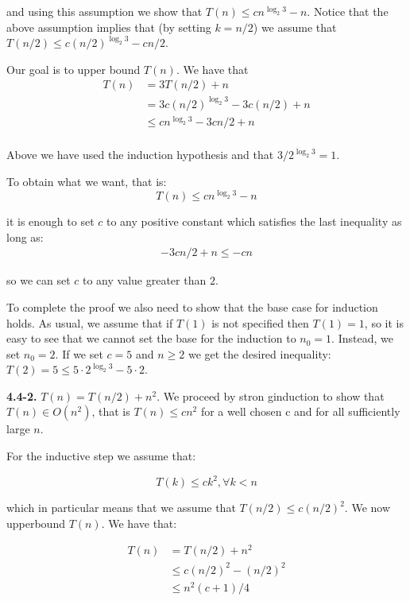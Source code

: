 \documentclass{article}
\newcommand{\Oh}{O}
\renewcommand{\leq}{\leqslant}
\renewcommand{\geq}{\geqslant}
\begin{document}
and using this assumption we show that $T(n) \leq cn^{\log_2 3} - n$. Notice that the above assumption implies that (by setting $k = n/2$) we assume that $T(n/2) \leq c(n/2)^{\log_2{3}} - cn/2$.

Our goal is to upper bound $T(n)$. We have that
\begin{equation*}
\begin{split}
T(n) &= 3T(n/2)+n \\
	 &= 3c(n/2)^{\log_2 3} - 3c(n/2) + n \\
	 & \leq cn^{\log_2 3} - 3cn / 2 + n \\
\end{split}
\end{equation*}

Above we have used the induction hypothesis and that  $3/2^{\log_2 3} = 1$.

To obtain what we want, that is:
\begin{equation*}
	T(n) \leq cn^{\log_2 3} - n
\end{equation*}

it is enough to set $c$ to any positive constant which satisfies the last inequality as long as:
\begin{align*}
	- 3cn / 2 + n \leq -cn
\end{align*}

so we can set $c$ to any value greater than $2$.

To complete the proof we also need to show that the base case for induction holds. As usual, we assume that if $T(1)$ is not specified then $T(1) = 1$, so it is easy to see that we cannot set the base for the induction to $n_0 = 1$. Instead, we set $n_0 = 2$. If we set $c = 5$ and $n \geq 2$ we get the desired inequality: $T(2) = 5 \leq 5 \cdot 2^{\log_2 3} - 5\cdot2$.


\noindent\textbf{4.4-2.} $T(n) = T(n / 2) + n^2$. We proceed by stron ginduction to show that $T(n) \in \Oh(n^2)$, that is $T(n) \leq cn^2$ for a well chosen c and for all sufficiently large $n$.

For the inductive step we assume that:

\begin{equation*}
\label{eq-second}
T(k) \leq ck^2, \forall k < n
\end{equation*}

which in particular means that we assume that $T(n/2) \leq c(n/2)^2$. We now upperbound $T(n)$. We have that:

\begin{equation*}
\label{eq-v1}
\begin{split}
T(n) &= T(n/2) + n^2 \\
	 & \leq c(n/2)^{2} - (n/2)^2 \\
	 & \leq n^2(c+1)/4 \\
\end{split}
\end{equation*}
\end{document}
